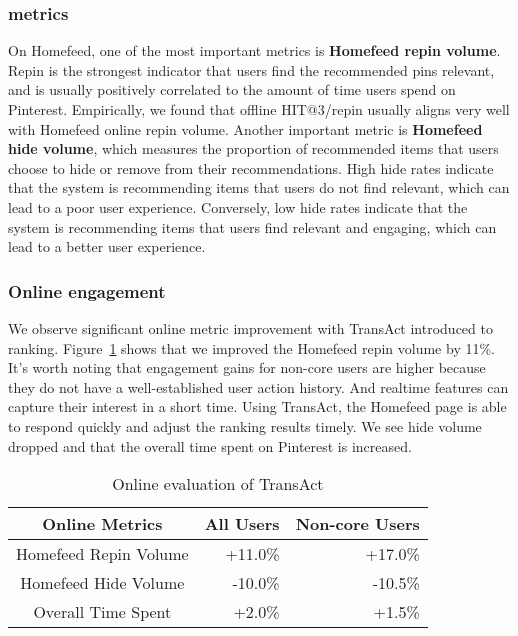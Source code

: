 \subsubsection{metrics}
On Homefeed, one of the most important metrics is \textbf{Homefeed repin volume}. Repin is the strongest indicator that users find the recommended pins relevant, and is usually positively correlated to the amount of time users spend on Pinterest. Empirically, we found that offline HIT@3/repin usually aligns very well with Homefeed online repin volume. Another important metric is \textbf{Homefeed hide volume}, which measures the proportion of recommended items that users choose to hide or remove from their recommendations. High hide rates indicate that the system is recommending items that users do not find relevant, which can lead to a poor user experience. Conversely, low hide rates indicate that the system is recommending items that users find relevant and engaging, which can lead to a better user experience. 





\subsubsection{Online engagement}

We observe significant online metric improvement with TransAct introduced to ranking. Figure~\ref{tab:online_metric} shows that we improved the Homefeed repin volume by 11\%.  It’s worth noting that engagement gains for non-core users are higher because they do not have a well-established user action history. And realtime features can capture their interest in a short time. Using TransAct, the Homefeed page is able to respond quickly and adjust the ranking results timely. We see hide volume dropped and that the overall time spent on Pinterest is increased.
\begin{table}
  \caption{Online evaluation of TransAct }
  \label{tab:online_metric}
  \begin{tabular}{crr}
    \toprule
    Online Metrics & All Users & Non-core Users\\
    \midrule
    Homefeed Repin Volume & +11.0\% & +17.0\%\\
    Homefeed Hide Volume & -10.0\% & -10.5\%\\
    Overall Time Spent & +2.0\% & +1.5\%\\
  \bottomrule
\end{tabular}
\end{table}

